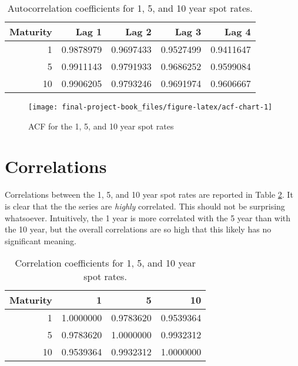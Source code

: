 \documentclass[openany]{book}
\theoremstyle{definition}
\theoremstyle{definition}
\theoremstyle{definition}
\theoremstyle{remark}
\begin{document}
\small

\begin{table}[H]

\caption{\label{tab:acf-table}Autocorrelation coefficients for 1, 5, and 10 year spot rates.}
\centering
\begin{tabular}[t]{rrrrr}
\toprule
Maturity & Lag 1 & Lag 2 & Lag 3 & Lag 4\\
\midrule
1 & 0.9878979 & 0.9697433 & 0.9527499 & 0.9411647\\
5 & 0.9911143 & 0.9791933 & 0.9686252 & 0.9599084\\
10 & 0.9906205 & 0.9793246 & 0.9691974 & 0.9606667\\
\bottomrule
\end{tabular}
\end{table}

\normalsize

\small

\begin{figure}[H]

{\centering \texttt{[image: final-project-book\_files/figure-latex/acf-chart-1]} 

}

\caption{ACF for the 1, 5, and 10 year spot rates}\label{fig:acf-chart}
\end{figure}

\normalsize

\hypertarget{correlations}{%
\section{Correlations}\label{correlations}}

Correlations between the 1, 5, and 10 year spot rates are reported in
Table \ref{tab:correlations}. It is clear that the the series are
\emph{highly} correlated. This should not be surprising whatsoever.
Intuitively, the 1 year is more correlated with the 5 year than with the
10 year, but the overall correlations are so high that this likely has
no significant meaning.

\small

\begin{table}[H]

\caption{\label{tab:correlations}Correlation coefficients for 1, 5, and 10 year spot rates.}
\centering
\begin{tabular}[t]{rrrr}
\toprule
Maturity & 1 & 5 & 10\\
\midrule
1 & 1.0000000 & 0.9783620 & 0.9539364\\
5 & 0.9783620 & 1.0000000 & 0.9932312\\
10 & 0.9539364 & 0.9932312 & 1.0000000\\
\bottomrule
\end{tabular}
\end{table}
\end{document}
